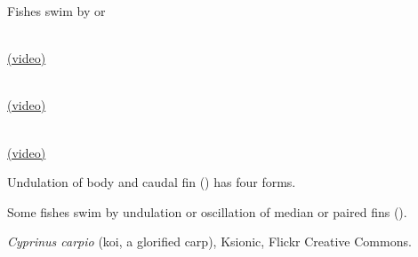 \documentclass[t,handout]{beamer}  %
\begin{document}
{
\begin{frame}[b,plain]{Fishes swim by  or }

\hspace{3em}%
	\parbox{\widthof{Anguilliform}}{\centering{}\\ %
		{\small \href{http://www.youtube.com/watch?v=LDrvbr_CbhE}{(video)}}}\hfill%
	\parbox{\widthof{Carangiform}}{\centering{}\\ %
		{\small \href{http://www.youtube.com/watch?v=OYrdFlr2vU8}{(video)}}}\hfill%
	\parbox{\widthof{Ostraciform}}{\centering{}\\ %
		{\small \href{http://www.youtube.com/watch?v=tsJzGycQMcE}{(video)}}}%
\hspace{3em}

\vspace{1\baselineskip}

\end{frame}
}

{
\begin{frame}[b,plain]{Undulation of body and caudal fin () has four forms.}

\end{frame}
}

{
\begin{frame}[b,plain]

\end{frame}
}

{
\begin{frame}[b,plain]{Some fishes swim by undulation or oscillation of median or paired fins ().}

\end{frame}
}

{
\begin{frame}[b,plain]

\end{frame}
}



{
\begin{frame}[b,plain]
\hfill\tiny\textcolor{white!40!orange}{\textit{Cyprinus carpio} (koi, a glorified carp), Ksionic, Flickr Creative Commons.}
\end{frame}
}
\end{document}
